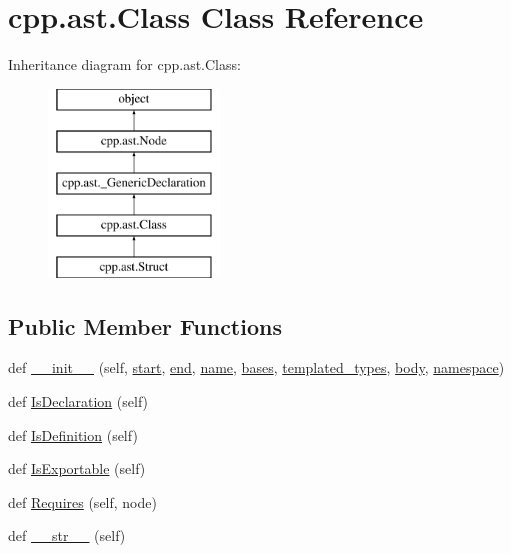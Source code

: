 \hypertarget{classcpp_1_1ast_1_1Class}{}\section{cpp.\+ast.\+Class Class Reference}
\label{classcpp_1_1ast_1_1Class}
Inheritance diagram for cpp.\+ast.\+Class\+:\begin{figure}[H]
\begin{center}
\leavevmode
\includegraphics[height=5.000000cm]{classcpp_1_1ast_1_1Class}
\end{center}
\end{figure}
\subsection*{Public Member Functions}
\begin{DoxyCompactItemize}
\item 
def \mbox{\hyperlink{classcpp_1_1ast_1_1Class_acc17c34512d5cc54d5125734ce79f219}{\+\_\+\+\_\+init\+\_\+\+\_\+}} (self, \mbox{\hyperlink{classcpp_1_1ast_1_1Node_a7b2aa97e6a049bb1a93aea48c48f1f44}{start}}, \mbox{\hyperlink{classcpp_1_1ast_1_1Node_a3c5e5246ccf619df28eca02e29d69647}{end}}, \mbox{\hyperlink{classcpp_1_1ast_1_1__GenericDeclaration_af774f4729dfd78d0538a6782fe8514c1}{name}}, \mbox{\hyperlink{classcpp_1_1ast_1_1Class_a5665eb67314a075d4e0ff91accbde5d1}{bases}}, \mbox{\hyperlink{classcpp_1_1ast_1_1Class_a48ed0d3115656554d9134bc1787390fa}{templated\+\_\+types}}, \mbox{\hyperlink{classcpp_1_1ast_1_1Class_add39f61fdcf6dae42d79cac3dcbb7782}{body}}, \mbox{\hyperlink{classcpp_1_1ast_1_1__GenericDeclaration_a8aee3f11b37449d54b42a78e0a689f46}{namespace}})
\item 
def \mbox{\hyperlink{classcpp_1_1ast_1_1Class_a4758bfb7c00410575932974e1ed8b7da}{Is\+Declaration}} (self)
\item 
def \mbox{\hyperlink{classcpp_1_1ast_1_1Class_ae6d2356f835d06d5109d9e4609d86780}{Is\+Definition}} (self)
\item 
def \mbox{\hyperlink{classcpp_1_1ast_1_1Class_a1ab749f8cfddb0903c6484791f70f42e}{Is\+Exportable}} (self)
\item 
def \mbox{\hyperlink{classcpp_1_1ast_1_1Class_a347673e0a2a7b840b7d2d1cae13977f7}{Requires}} (self, node)
\item 
def \mbox{\hyperlink{classcpp_1_1ast_1_1Class_a0a63f6fab75d61ffac6fb9f1c29ae84d}{\+\_\+\+\_\+str\+\_\+\+\_\+}} (self)
\end{DoxyCompactItemize}

